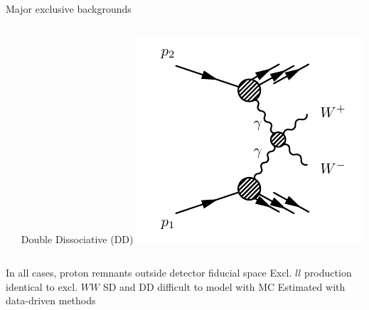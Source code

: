 \documentclass[10pt]{beamer}
\begin{document}
\begin{frame}{Major exclusive backgrounds}
\begin{columns}
\begin{column}{0.33\linewidth}
	\end{column}
	\begin{column}{0.33\linewidth}
\centering
Double Dissociative (DD)
   \includegraphics[width=\textwidth]{figures/exclWWdd.pdf}
	\end{column}
\end{columns}
\begin{outline}
\1 In all cases, proton remnants outside detector fiducial space 
\1 Excl. $ll$ production identical to excl. $WW$ 
\1 SD and DD difficult to model with MC
	\2 Estimated with data-driven methods
\end{outline}
\end{frame}
\end{document}
